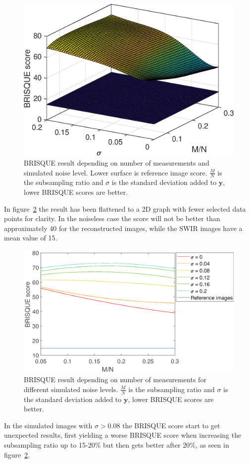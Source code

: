 \begin{figure}[H]
    \centering
    \includegraphics[width = 0.7\linewidth]{result/synt_brisque/BRISQUE_fit.eps}
    \caption{BRISQUE result depending on number of measurements and simulated noise level. Lower surface is reference image score. $\frac{M}{N}$ is the subsampling ratio and $\sigma$ is the standard deviation added to $\mathbf{y}$, lower BRISQUE scores are better.}
    \label{fig:Brisque_3d}
\end{figure}

In figure~\ref{fig:Brisque_2d} the result has been flattened to a 2D graph with fewer selected data points for clarity. In the noiseless case the score will not be better than approximately 40 for the reconstructed images, while the SWIR images have a mean value of 15.


\begin{figure}[H]
    \centering
    \includegraphics[width = 0.95\linewidth]{result/synt_brisque/Brisque_fit_flat3.eps}
    \caption{BRISQUE result depending on number of measurements for different simulated noise levels. $\frac{M}{N}$ is the subsampling ratio and $\sigma$ is the standard deviation added to $\mathbf{y}$, lower BRISQUE scores are better.}
    \label{fig:Brisque_2d}
\end{figure}

In the simulated images with $\sigma > 0.08$ the BRISQUE score start to get unexpected results, first yielding a worse BRISQUE score when increasing the subsampling ratio up to 15-20\%  but then gets better after 20\%, as seen in figure~\ref{fig:Brisque_2d}.

